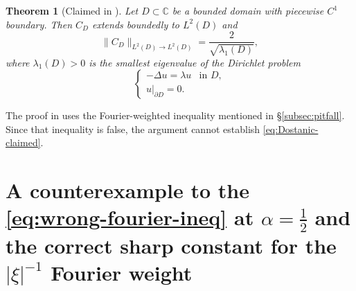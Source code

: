 \documentclass{amsart}
\newcommand{\C}{\mathbb{C}}
\newcommand{\abs}[1]{\left|#1\right|}
\theoremstyle{plain}
\newtheorem{theorem}{Theorem}
\theoremstyle{remark}
\begin{document}
\begin{theorem}[Claimed in \cite{Dostanic1996}]\label{thm:Dostanic-claimed}
Let $D\subset\C$ be a bounded domain with piecewise $C^1$ boundary. Then $C_D$
extends boundedly to $L^2(D)$ and
\begin{equation}\label{eq:Dostanic-claimed}
\|C_D\|_{L^2(D)\to L^2(D)}=\frac{2}{\sqrt{\lambda_1(D)}},
\end{equation}
where $\lambda_1(D)>0$ is the smallest eigenvalue of the Dirichlet problem
\begin{equation}\label{eq:Dirichlet-eigen}
\begin{cases}
-\Delta u=\lambda u & \text{in } D,\\
u|_{\partial D}=0. &
\end{cases}
\end{equation}
\end{theorem}


The proof in \cite{Dostanic1996} uses the Fourier-weighted inequality mentioned
in \S\ref{subsec:pitfall}. Since that inequality is false, the argument cannot
establish \eqref{eq:Dostanic-claimed}.

\section{A counterexample to the \eqref{eq:wrong-fourier-ineq}  at $\alpha=\tfrac12$ and the correct sharp constant for the $\abs{\xi}^{-1}$ Fourier weight}\label{22}
\end{document}

